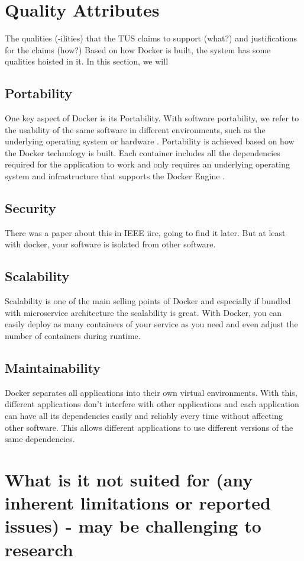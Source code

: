 \documentclass[fleqn,12pt]{olplainarticle}
\begin{document}
\section{Quality Attributes}

The qualities (-ilities) that the TUS claims to support (what?) and justifications for the claims (how?)
Based on how Docker is built, the system has some qualities hoisted in it. In this section, we will 

\subsection{Portability}
One key aspect of Docker is its Portability. With software portability, we refer to the usability of the same software in different environments, such as the underlying operating system or hardware \citep{wiki:Software_portability}. Portability is achieved based on how the Docker technology is built. Each container includes all the dependencies required for the application to work and only requires an underlying operating system and infrastructure that supports the Docker Engine \citep{hy:DevOps_with_Docker}.
\subsection{Security}
There was a paper about this in IEEE iirc, going to find it later. But at least with docker, your software is isolated from other software.
\subsection{Scalability}
Scalability is one of the main selling points of Docker and especially if bundled with microservice architecture the scalability is great. With Docker, you can easily deploy as many containers of your service as you need and even adjust the number of containers during runtime.
\subsection{Maintainability}
Docker separates all applications into their own virtual environments. With this, different applications don't interfere with other applications and each application can have all its dependencies easily and reliably every time without affecting other software. This allows different applications to use different versions of the same dependencies.

\section{What is it not suited for (any inherent limitations or reported issues) - may be challenging to research}
\end{document}
